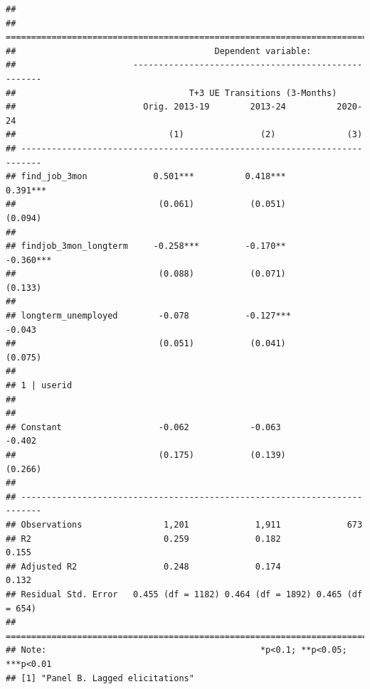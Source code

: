 \documentclass[
]{article}
\begin{document}
\begin{verbatim}
## 
## ==========================================================================
##                                       Dependent variable:                 
##                       ----------------------------------------------------
##                                  T+3 UE Transitions (3-Months)            
##                         Orig. 2013-19        2013-24          2020-24     
##                              (1)               (2)              (3)       
## --------------------------------------------------------------------------
## find_job_3mon             0.501***          0.418***          0.391***    
##                            (0.061)           (0.051)          (0.094)     
##                                                                           
## findjob_3mon_longterm     -0.258***         -0.170**         -0.360***    
##                            (0.088)           (0.071)          (0.133)     
##                                                                           
## longterm_unemployed        -0.078           -0.127***          -0.043     
##                            (0.051)           (0.041)          (0.075)     
##                                                                           
## 1 | userid                                                                
##                                                                           
##                                                                           
## Constant                   -0.062            -0.063            -0.402     
##                            (0.175)           (0.139)          (0.266)     
##                                                                           
## --------------------------------------------------------------------------
## Observations                1,201             1,911             673       
## R2                          0.259             0.182            0.155      
## Adjusted R2                 0.248             0.174            0.132      
## Residual Std. Error   0.455 (df = 1182) 0.464 (df = 1892) 0.465 (df = 654)
## ==========================================================================
## Note:                                          *p<0.1; **p<0.05; ***p<0.01
## [1] "Panel B. Lagged elicitations"
\end{verbatim}
\end{document}
